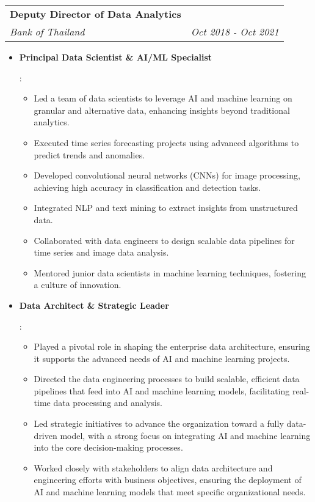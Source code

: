 \documentclass[letterpaper,11pt]{article}
\makeatletter
\newcommand{\resumeItem}[2]{
  \item\small{
    \textbf{#1}{: #2 \vspace{-2pt}}
  }
}
\newcommand{\resumeSubheading}[4]{
  \vspace{-1pt}\item
    \begin{tabular*}{0.97\textwidth}[t]{l@{\extracolsep{\fill}}r}
      \textbf{#1} & #2 \\
      \textit{\small#3} & \textit{\small #4} \\
    \end{tabular*}\vspace{-5pt}
}
\newcommand{\resumeItemListStart}{\begin{itemize}}
\newcommand{\resumeItemListEnd}{\end{itemize}\vspace{-5pt}}
\makeatother
\begin{document}
    \resumeSubheading
      {Deputy Director of Data Analytics}{}
      {Bank of Thailand}{Oct 2018 - Oct 2021}
      \resumeItemListStart
      \resumeItem{Principal Data Scientist \& AI/ML Specialist}{
      \begin{itemize}
        \item Led a team of data scientists to leverage AI and machine learning on granular and alternative data, enhancing insights beyond traditional analytics.
        \item Executed time series forecasting projects using advanced algorithms to predict trends and anomalies.
        \item Developed convolutional neural networks (CNNs) for image processing, achieving high accuracy in classification and detection tasks.
        \item Integrated NLP and text mining to extract insights from unstructured data.
        \item Collaborated with data engineers to design scalable data pipelines for time series and image data analysis.
        \item Mentored junior data scientists in machine learning techniques, fostering a culture of innovation.
      \end{itemize}
      }
      \resumeItem{Data Architect \& Strategic Leader}{
      \begin{itemize}
        \item Played a pivotal role in shaping the enterprise data architecture, ensuring it supports the advanced needs of AI and machine learning projects.
        \item Directed the data engineering processes to build scalable, efficient data pipelines that feed into AI and machine learning models, facilitating real-time data processing and analysis.
        \item Led strategic initiatives to advance the organization toward a fully data-driven model, with a strong focus on integrating AI and machine learning into the core decision-making processes.
        \item Worked closely with stakeholders to align data architecture and engineering efforts with business objectives, ensuring the deployment of AI and machine learning models that meet specific organizational needs.
      \end{itemize}
      }
  \resumeItemListEnd
\end{document}
